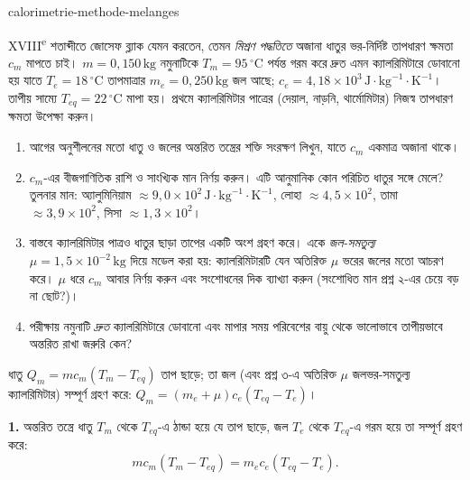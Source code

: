 \begin{exo}{calorimetrie-methode-melanges}

XVIII\textsuperscript{e} শতাব্দীতে জোসেফ ব্ল্যাক যেমন করতেন, তেমন \emph{মিশ্রণ পদ্ধতিতে} অজানা ধাতুর ভর-নির্দিষ্ট তাপধারণ ক্ষমতা $c_m$ মাপতে চাই। $m=0{,}150\,\text{kg}$ নমুনাটিকে $T_m=95\,{}^\circ\text{C}$ পর্যন্ত গরম করে দ্রুত এমন ক্যালরিমিটারে ডোবানো হয় যাতে $T_e=18\,{}^\circ\text{C}$ তাপমাত্রার $m_e=0{,}250\,\text{kg}$ জল আছে; $c_e=4{,}18\times10^3\,\text{J}\!\cdot\!\text{kg}^{-1}\!\cdot\!\text{K}^{-1}$। তাপীয় সাম্যে $T_{eq}=22\,{}^\circ\text{C}$ মাপা হয়। প্রথমে ক্যালরিমিটার পাত্রের (দেয়াল, নাড়নি, থার্মোমিটার) নিজস্ব তাপধারণ ক্ষমতা উপেক্ষা করুন।

\begin{enumerate}
  \item আগের অনুশীলনের মতো ধাতু ও জলের অন্তরিত তন্ত্রের শক্তি সংরক্ষণ লিখুন, যাতে $c_m$ একমাত্র অজানা থাকে।
  \item $c_m$-এর বীজগাণিতিক রাশি ও সাংখ্যিক মান নির্ণয় করুন। এটি আনুমানিক কোন পরিচিত ধাতুর সঙ্গে মেলে? তুলনার মান: অ্যালুমিনিয়াম $\approx9{,}0\times10^2\,\text{J}\!\cdot\!\text{kg}^{-1}\!\cdot\!\text{K}^{-1}$, লোহা $\approx4{,}5\times10^2$, তামা $\approx3{,}9\times10^2$, সিসা $\approx1{,}3\times10^2$।
  \item বাস্তবে ক্যালরিমিটার পাত্রও ধাতুর ছাড়া তাপের একটি অংশ গ্রহণ করে। একে \emph{জল-সমতুল্য} $\mu=1{,}5\times10^{-2}\,\text{kg}$ দিয়ে মডেল করা হয়: ক্যালরিমিটারটি যেন অতিরিক্ত $\mu$ ভরের জলের মতো আচরণ করে। $\mu$ ধরে $c_m$ আবার নির্ণয় করুন এবং সংশোধনের দিক ব্যাখ্যা করুন (সংশোধিত মান প্রশ্ন ২-এর চেয়ে বড় না ছোট?)।
  \item পরীক্ষায় নমুনাটি \emph{দ্রুত} ক্যালরিমিটারে ডোবানো এবং মাপার সময় পরিবেশের বায়ু থেকে ভালোভাবে তাপীয়ভাবে অন্তরিত রাখা জরুরি কেন?
\end{enumerate}

\begin{indication}
ধাতু $Q_m=mc_m(T_m-T_{eq})$ তাপ ছাড়ে; তা জল (এবং প্রশ্ন ৩-এ অতিরিক্ত $\mu$ জলভর-সমতুল্য ক্যালরিমিটার) সম্পূর্ণ গ্রহণ করে: $Q_m=(m_e+\mu)c_e(T_{eq}-T_e)$।
\end{indication}

\begin{solution}
\textbf{1.} অন্তরিত তন্ত্রে ধাতু $T_m$ থেকে $T_{eq}$-এ ঠান্ডা হয়ে যে তাপ ছাড়ে, জল $T_e$ থেকে $T_{eq}$-এ গরম হয়ে তা সম্পূর্ণ গ্রহণ করে:
\[
mc_m(T_m-T_{eq})=m_ec_e(T_{eq}-T_e).
\]


\end{solution}
\end{exo}

